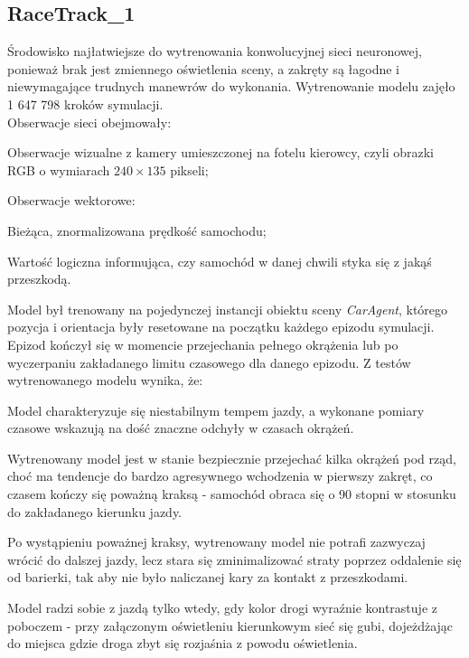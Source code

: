 \subsection{RaceTrack\_1}
Środowisko najłatwiejsze do wytrenowania konwolucyjnej sieci neuronowej, ponieważ brak jest zmiennego oświetlenia sceny, a zakręty są łagodne i niewymagające trudnych manewrów do wykonania. Wytrenowanie modelu zajęło 1 647 798 kroków symulacji. \\
Obserwacje sieci obejmowały:
\begin{enumerate*}
\item Obserwacje wizualne z kamery umieszczonej na fotelu kierowcy, czyli obrazki RGB o wymiarach $240 \times 135$ pikseli;
\item Obserwacje wektorowe:
\begin{itemize*}
\item Bieżąca, znormalizowana prędkość samochodu;
\item Wartość logiczna informująca, czy samochód w danej chwili styka się z jakąś przeszkodą.
\end{itemize*}
\end{enumerate*}

Model był trenowany na pojedynczej instancji obiektu sceny \textit{CarAgent}, którego pozycja i orientacja były resetowane na początku każdego epizodu symulacji. Epizod kończył się w momencie przejechania pełnego okrążenia lub po wyczerpaniu zakładanego limitu czasowego dla danego epizodu. Z testów wytrenowanego modelu wynika, że:
\begin{enumerate*}
\item Model charakteryzuje się niestabilnym tempem jazdy, a wykonane pomiary czasowe wskazują na dość znaczne odchyły w czasach okrążeń.
\item Wytrenowany model jest w stanie bezpiecznie przejechać kilka okrążeń pod rząd, choć ma tendencje do bardzo agresywnego wchodzenia w pierwszy zakręt, co czasem kończy się poważną kraksą - samochód obraca się o 90 stopni w stosunku do zakładanego kierunku jazdy.
\item Po wystąpieniu poważnej kraksy, wytrenowany model nie potrafi zazwyczaj wrócić do dalszej jazdy, lecz stara się zminimalizować straty poprzez oddalenie się od barierki, tak aby nie było naliczanej kary za kontakt z przeszkodami.
\item Model radzi sobie z jazdą tylko wtedy, gdy kolor drogi wyraźnie kontrastuje z poboczem - przy załączonym oświetleniu kierunkowym sieć się gubi, dojeżdżając do miejsca gdzie droga zbyt się rozjaśnia z powodu oświetlenia.
\end{enumerate*}

